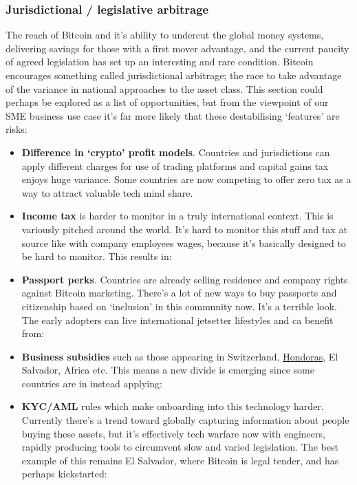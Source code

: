 \subsubsection{Jurisdictional / legislative  arbitrage}
The reach of Bitcoin and it's ability to undercut the global money systems, delivering savings for those with a first mover advantage, and the current paucity of agreed legislation has set up an interesting and rare condition. Bitcoin encourages something called jurisdictional arbitrage; the race to take advantage of the variance in national approaches to the asset class. This section could perhaps be explored as a list of opportunities, but from the viewpoint of our SME business use case it's far more likely that these destabilising `features' are risks: 
\begin{itemize}
\item \textbf{Difference in `crypto' profit models}. Countries and jurisdictions can apply different charges for use of trading platforms and capital gains tax enjoys huge variance. Some countries are now competing to offer zero tax as a way to attract valuable tech mind share. 
\item \textbf{Income tax} is harder to monitor in a truly international context. This is variously pitched around the world.  It's hard to monitor this stuff and tax at source like with company employees wages, because it's basically designed to be hard to monitor. This results in:
\item \textbf{Passport perks}. Countries are already selling residence and company rights against Bitcoin marketing. There's a lot of new ways to buy passports and citizenship based on `inclusion' in this community now. It's a terrible look. The early adopters can live international jetsetter lifestyles and ca benefit from:
\item \textbf{Business subsidies} such as those appearing in Switzerland, \href{https://davisclute.medium.com/visiting-a-startup-city-in-honduras-73d9c026ee6d}{Hondoras}, El Salvador, Africa etc. This means a new divide is emerging since some countries are in instead applying:
\item \textbf{KYC/AML} rules which make onboarding into this technology harder. Currently there's a trend toward globally capturing information about people buying these assets, but it's effectively tech warfare now with engineers, rapidly producing tools to circumvent slow and varied legislation. The best example of this remains El Salvador, where Bitcoin is legal tender, and has perhaps kickstarted:

\end{itemize}
